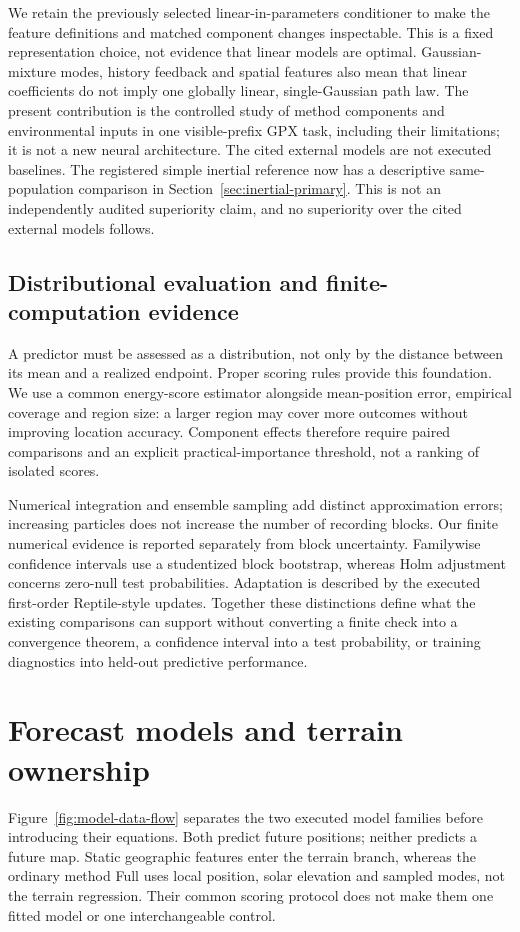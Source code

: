 \documentclass[11pt]{article}
\begin{document}
We retain the previously selected linear-in-parameters conditioner to make
the feature definitions and matched component changes inspectable.
This is a fixed representation choice, not evidence that linear models
are optimal. Gaussian-mixture modes, history feedback and spatial features
also mean that linear coefficients do not imply one globally linear,
single-Gaussian path law. The present contribution is the controlled study
of method components and environmental inputs in one visible-prefix GPX
task, including their limitations; it is not a new neural architecture.
The cited external models are not executed baselines. The registered simple
inertial reference now has a descriptive same-population comparison in
Section~\ref{sec:inertial-primary}. This is not an independently audited
superiority claim, and no superiority over the cited external models follows.

\subsection{Distributional evaluation and finite-computation evidence}
A predictor must be assessed as a distribution, not only by the distance
between its mean and a realized endpoint. Proper scoring rules provide
this foundation\cite{gneiting2007,gneiting2008}. We use a common energy-score
estimator alongside mean-position error, empirical coverage and region
size: a larger region may cover more outcomes without improving location
accuracy. Component effects therefore require paired comparisons and an
explicit practical-importance threshold, not a ranking of isolated scores.

Numerical integration and ensemble sampling add distinct approximation
errors\cite{kloeden1992}; increasing particles does not increase the number
of recording blocks. Our finite numerical evidence is reported separately
from block uncertainty. Familywise confidence intervals use a studentized
block bootstrap\cite{davison1997}, whereas Holm adjustment concerns
zero-null test probabilities\cite{holm1979}. Adaptation is described by the
executed first-order Reptile-style updates\cite{nichol2018}.
Together these distinctions define what the existing comparisons can
support without converting a finite check into a convergence theorem,
a confidence interval into a test probability, or training diagnostics
into held-out predictive performance.

\section{Forecast models and terrain ownership}
\label{sec:models}
Figure~\ref{fig:model-data-flow} separates the two executed model families
before introducing their equations. Both predict future positions; neither
predicts a future map. Static geographic features enter the terrain branch,
whereas the ordinary method Full uses local position, solar elevation and
sampled modes, not the terrain regression. Their common scoring protocol
does not make them one fitted model or one interchangeable control.
\end{document}
